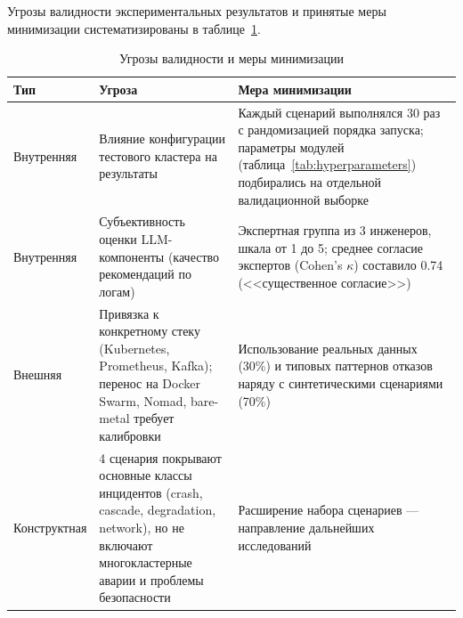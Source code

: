 Угрозы валидности экспериментальных результатов и принятые меры минимизации систематизированы в таблице~\ref{tab:threats_validity}.

\begin{table}[H]
\centering
\caption{Угрозы валидности и меры минимизации}
\label{tab:threats_validity}
\begin{tabular}{|p{3cm}|p{4.5cm}|p{4.5cm}|}
\hline
\textbf{Тип} & \textbf{Угроза} & \textbf{Мера минимизации} \\
\hline
Внутренняя & Влияние конфигурации тестового кластера на результаты & Каждый сценарий выполнялся 30 раз с рандомизацией порядка запуска; параметры модулей (таблица~\ref{tab:hyperparameters}) подбирались на отдельной валидационной выборке \\
\hline
Внутренняя & Субъективность оценки LLM-компоненты (качество рекомендаций по логам) & Экспертная группа из 3 инженеров, шкала от 1 до 5; среднее согласие экспертов (Cohen's $\kappa$) составило 0.74 (<<существенное согласие>>) \\
\hline
Внешняя & Привязка к конкретному стеку (Kubernetes, Prometheus, Kafka); перенос на Docker Swarm, Nomad, bare-metal требует калибровки & Использование реальных данных (30\%) и типовых паттернов отказов \cite{netflix_chaos,aiops_survey} наряду с синтетическими сценариями (70\%) \\
\hline
Конструктная & 4 сценария покрывают основные классы инцидентов (crash, cascade, degradation, network), но не включают многокластерные аварии и проблемы безопасности & Расширение набора сценариев --- направление дальнейших исследований \\
\hline
\end{tabular}
\end{table}
